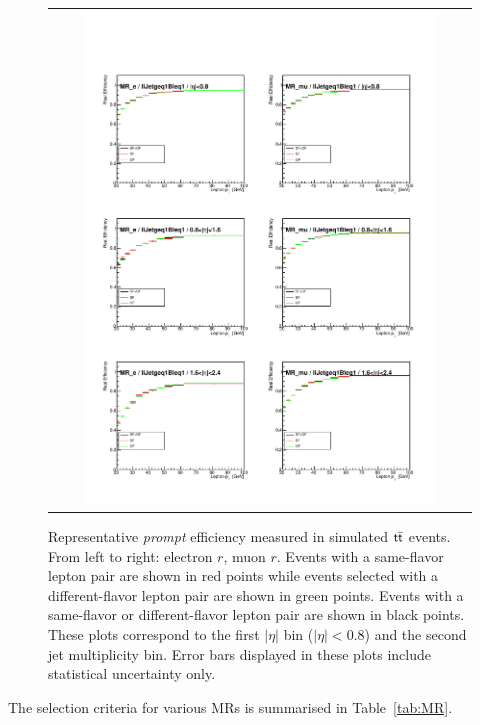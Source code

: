 \begin{figure}[tbh!]
 \begin{center}
 \begin{tabular}{c}
 \includegraphics[width=0.85\textwidth]{figures/Part3/Nonprompt/MR/real_eff}
 \end{tabular}
 \caption{Representative \emph{prompt} efficiency measured in simulated $\textsf{t}\overline{\textsf{t}}$ events. From left to right: electron $r$, muon $r$. Events with a same-flavor lepton pair are shown in red points while events selected with a different-flavor lepton pair are shown in green points. Events with a same-flavor or different-flavor lepton pair are shown in black points. These plots correspond to the first $|\eta|$ bin ($|\eta|<$0.8) and the second jet multiplicity bin. Error bars displayed in these plots include statistical uncertainty only. }
 \label{fig:real_eff}
 \end{center}
\end{figure}

The selection criteria for various \acp{MR} is summarised in Table~\ref{tab:MR}.

